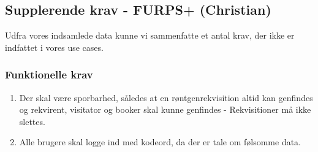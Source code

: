 \subsection*{Supplerende krav - FURPS+ (Christian)}
Udfra vores indsamlede data kunne vi sammenfatte et antal krav, der ikke er
indfattet i vores use cases.
\subsubsection*{Funktionelle krav}
\begin{enumerate}
  \item Der skal være sporbarhed, således at en røntgenrekvisition altid kan
  genfindes og rekvirent, visitator og booker skal kunne genfindes -
  Rekvisitioner må ikke slettes.
  \item Alle brugere skal logge ind med kodeord, da der er tale om følsomme
  data.
\end{enumerate}

